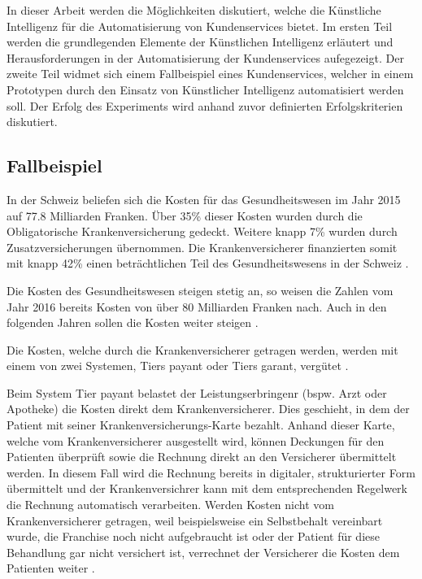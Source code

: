 \documentclass[12pt, twoside, table]{extarticle}
\begin{document}
In dieser Arbeit werden die Möglichkeiten diskutiert, welche die Künstliche Intelligenz für die Automatisierung von Kundenservices bietet. Im ersten Teil werden die grundlegenden Elemente der Künstlichen Intelligenz erläutert und Herausforderungen in der Automatisierung der Kundenservices aufegezeigt.  Der zweite Teil widmet sich einem Fallbeispiel eines Kundenservices, welcher in einem Prototypen durch den Einsatz von Künstlicher Intelligenz automatisiert werden soll. Der Erfolg des Experiments wird anhand zuvor definierten Erfolgskriterien diskutiert.

\subsection{Fallbeispiel}

In der Schweiz beliefen sich die Kosten für das Gesundheitswesen im Jahr 2015 auf 77.8 Milliarden Franken. Über 35\% dieser Kosten wurden durch die Obligatorische Krankenversicherung gedeckt. Weitere knapp 7\% wurden durch Zusatzversicherungen übernommen. Die Krankenversicherer finanzierten somit mit knapp 42\% einen beträchtlichen Teil des Gesundheitswesens in der Schweiz \cite{BundesamtfurStatistik2018Finanzierung, BundesamtfurStatistik2017KostenDaten}.

Die Kosten des Gesundheitswesen steigen stetig an, so weisen die Zahlen vom Jahr 2016 bereits Kosten von über 80 Milliarden Franken nach. Auch in den folgenden Jahren sollen die Kosten weiter steigen \cite{BundesamtfurStatistik2018Finanzierung}.

Die Kosten, welche durch die Krankenversicherer getragen werden, werden mit einem von zwei Systemen, Tiers payant oder Tiers garant, vergütet \cite{EidgenossischesDepartementdesInnern2017FaktenblattVergutungssysteme}. 

Beim System Tier payant belastet der Leistungserbringenr (bspw. Arzt oder Apotheke) die Kosten direkt dem Krankenversicherer. Dies geschieht, in dem der Patient mit seiner Kranken\-versicherungs-Karte bezahlt. Anhand dieser Karte, welche vom Krankenversicherer ausgestellt wird, können Deckungen für den Patienten überprüft sowie die Rechnung direkt an den Versicherer übermittelt werden. In diesem Fall wird die Rechnung bereits in digitaler, strukturierter Form übermittelt und der Krankenversichrer kann mit dem entsprechenden Regelwerk die Rechnung automatisch verarbeiten. Werden Kosten nicht vom Krankenversicherer getragen, weil beispielsweise ein Selbstbehalt vereinbart wurde, die Franchise noch nicht aufgebraucht ist oder der Patient für diese Behandlung gar nicht versichert ist, verrechnet der Versicherer die Kosten dem Patienten weiter \cite{EidgenossischesDepartementdesInnern2017FaktenblattVergutungssysteme}.
\end{document}
